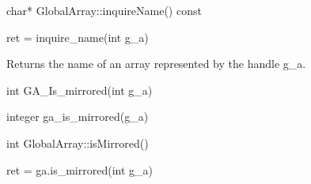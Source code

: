 \documentclass[12pt]{article}
\begin{document}
\begin{cxxapi}
\begin{cxxcode}
char* GlobalArray::inquireName() const
\end{cxxcode}
\end{cxxapi}

\begin{pyapi}
\begin{pycode}
ret = inquire_name(int g_a)
\end{pycode}
\begin{funcargs}
\end{funcargs}
\end{pyapi}

\local

\begin{desc}

Returns the name of an array represented by the handle g_a.

\end{desc}


\begin{capi}
\begin{ccode}
int GA_Is_mirrored(int g_a)
\end{ccode}
\begin{funcargs}
\end{funcargs}
\end{capi}

\begin{fapi}
\begin{fcode}
integer ga_is_mirrored(g_a)
\end{fcode}
\begin{funcargs}
\end{funcargs}
\end{fapi}

\begin{cxxapi}
\begin{cxxcode}
int GlobalArray::isMirrored()
\end{cxxcode}
\end{cxxapi}

\begin{pyapi}
\begin{pycode}
ret = ga.is_mirrored(int g_a)
\end{pycode}
\begin{funcargs}
\end{funcargs}
\end{pyapi}
\end{document}
